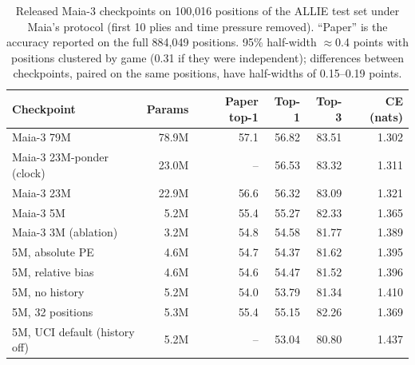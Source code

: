 \begin{table}[t]\centering\small
\caption{Released Maia-3 checkpoints on 100,016 positions of the ALLIE test set under Maia's protocol
(first 10 plies and time pressure removed). ``Paper'' is the accuracy reported on the full 884,049 positions.
95\% half-width $\approx$0.4 points with positions clustered by game (0.31 if they were independent);
differences between checkpoints, paired on the same positions, have half-widths of 0.15--0.19 points.}\label{tab:maia3}
\begin{tabular}{lrrrrr}\toprule
Checkpoint & Params & Paper top-1 & Top-1 & Top-3 & CE (nats)\\\midrule
Maia-3 79M & 78.9M & 57.1 & 56.82 & 83.51 & 1.302 \\
Maia-3 23M-ponder (clock) & 23.0M & -- & 56.53 & 83.32 & 1.311 \\
Maia-3 23M & 22.9M & 56.6 & 56.32 & 83.09 & 1.321 \\
Maia-3 5M & 5.2M & 55.4 & 55.27 & 82.33 & 1.365 \\
Maia-3 3M (ablation) & 3.2M & 54.8 & 54.58 & 81.77 & 1.389 \\
5M, absolute PE & 4.6M & 54.7 & 54.37 & 81.62 & 1.395 \\
5M, relative bias & 4.6M & 54.6 & 54.47 & 81.52 & 1.396 \\
5M, no history & 5.2M & 54.0 & 53.79 & 81.34 & 1.410 \\
5M, 32 positions & 5.3M & 55.4 & 55.15 & 82.26 & 1.369 \\
5M, UCI default (history off) & 5.2M & -- & 53.04 & 80.80 & 1.437 \\
\bottomrule\end{tabular}\end{table}
